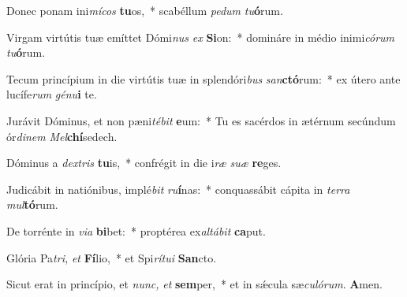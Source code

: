 \item Donec ponam ini\textit{mícos} \textbf{tu}os,~* scabéllum \textit{pedum} \textit{tu}\textbf{ó}rum.
\item Virgam virtútis tuæ emíttet Dómi\textit{nus} \textit{ex} \textbf{Si}on:~* domináre in médio inimi\hspace*{0.03em}\textit{córum} \textit{tu}\textbf{ó}rum.
\item Tecum princípium in die virtútis tuæ in splendóri\textit{bus} \textit{san}\textbf{ctó}rum:~* ex útero ante lucífe\textit{rum} \textit{génu}\textbf{i} te.
\item Jurávit Dóminus, et non pæni\hspace*{0.03em}\textit{tébit} \textbf{e}um:~* Tu es sacérdos in ætérnum secúndum ór\textit{dinem} \textit{Mel}\textbf{chí}sedech.
\item Dóminus a \textit{dextris} \textbf{tu}is,~* confrégit in die i\hspace*{0.03em}\textit{ræ} \textit{suæ} \textbf{re}ges.
\item Judicábit in natiónibus, implé\textit{bit} \textit{ru}\textbf{í}nas:~* conquassábit cápita in \textit{terra} \textit{mul}\textbf{tó}rum.
\item De torrénte in \textit{via} \textbf{bi}bet:~* proptérea ex\hspace*{0.03em}\textit{altábit} \textbf{ca}put.
\item Glória Pa\hspace*{0.03em}\textit{tri,} \textit{et} \textbf{Fí}lio,~* et Spi\hspace*{0.03em}\textit{rítui} \textbf{San}cto.
\item Sicut erat in princípio, et \textit{nunc,} \textit{et} \textbf{sem}per,~* et in sǽcula sæ\textit{culórum}. \textbf{A}men.